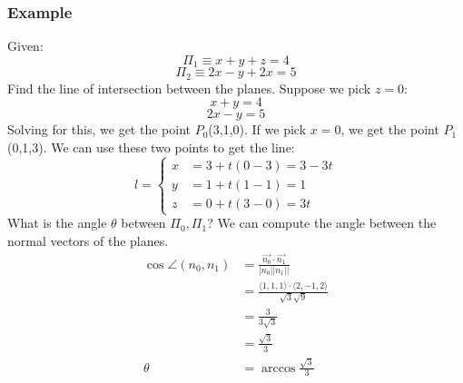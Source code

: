 \documentclass{math}
\begin{document}
\subsubsection*{Example}
Given:
\[ \Pi_1 \equiv x+y+z = 4 \]
\[ \Pi_2 \equiv 2x-y+2x = 5 \]
Find the line of intersection between the planes. Suppose we pick \( z = 0 \):
\[ x+y = 4 \]
\[ 2x-y = 5 \]
Solving for this, we get the point \( P_0 \)(3,1,0). If we pick \( x = 0 \), we
get the point \( P_1 \)(0,1,3). We can use these two points to get the line:
\[ l = \begin{cases}
  x &= 3+t(0-3) = 3-3t\\
  y &= 1+t(1-1) = 1 \\
  z &= 0+t(3-0) = 3t
\end{cases} \]
What is the angle \( \theta \) between \( \Pi_0,\Pi_1 \)? We can compute the
angle between the normal vectors of the planes.
\begin{align*}
  \cos\angle(n_0,n_1) &= \frac{\vec{n_0}\cdot\vec{n_1}}{|n_0||n_1||} \\
  &= \frac{\langle1,1,1\rangle\cdot\langle2,-1,2\rangle}{\sqrt{3}\sqrt{9}} \\
  &= \frac{3}{3\sqrt{3}} \\
  &= \frac{\sqrt{3}}{3} \\
  \theta &= \arccos\frac{\sqrt{3}}{3}
\end{align*}
\end{document}
